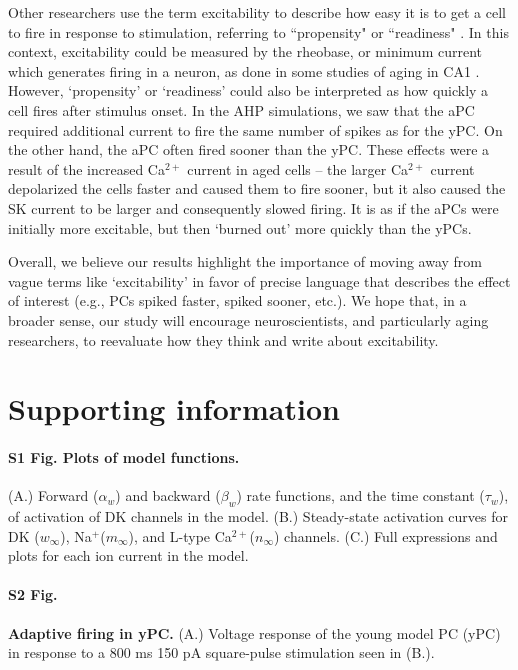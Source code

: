 \documentclass[10pt,letterpaper]{article}
\newcommand{\Ca}{Ca$^{2+}$}
\newcommand{\Na}{Na$^{+}$}
\begin{document}
Other researchers use the term excitability to describe how easy it is to get a cell to fire in response to stimulation, referring to ``propensity" \cite{daoudal2003long} or ``readiness" \cite{konstantinovic2019effects}. In this context, excitability could be measured by the rheobase, or minimum current which generates firing in a neuron, as done in some studies of aging in CA1 \cite{potier1993age}. However, `propensity' or `readiness' could also be interpreted as how quickly a cell fires after stimulus onset. In the AHP simulations, we saw that the aPC required additional current to fire the same number of spikes as for the yPC. On the other hand, the aPC often fired sooner than the yPC. These effects were a result of the increased {\Ca} current in aged cells -- the larger {\Ca} current depolarized the cells faster and caused them to fire sooner, but it also caused the SK current to be larger and consequently slowed firing. It is as if the aPCs were initially more excitable, but then `burned out' more quickly than the yPCs. 

Overall, we believe our results highlight the importance of moving away from vague terms like `excitability' in favor of precise language that describes the effect of interest (e.g., PCs spiked faster, spiked sooner, etc.). We hope that, in a broader sense, our study will encourage neuroscientists, and particularly aging researchers, to reevaluate how they think and write about excitability.

\color{blue}
\section*{Supporting information}

\paragraph*{S1 Fig. Plots of model functions.} (A.) Forward ($\alpha_w$) and backward ($\beta_w$) rate functions, and the time constant ($\tau_w$), of activation of DK channels in the model. (B.) Steady-state activation curves for DK ($w_{\infty}$), \Na ($m_{\infty}$), and L-type \Ca ($n_{\infty}$) channels. (C.) Full expressions and plots for each ion current in the model.
\label{S1_Fig}

\paragraph*{S2 Fig.}
\label{S2_Fig}
{\bf Adaptive firing in yPC.} (A.) Voltage response of the young model PC (yPC) in response to a 800 ms 150 pA square-pulse stimulation seen in (B.).
\end{document}
